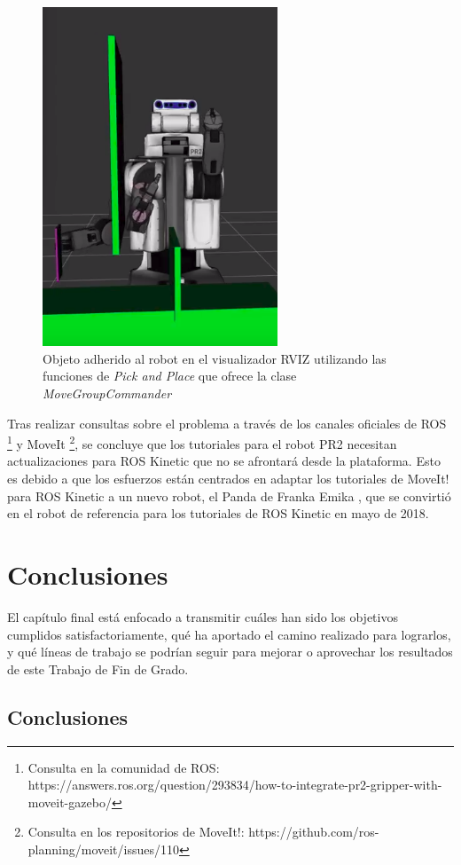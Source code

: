 \documentclass[12pt,spanish,chapterprefix, numbers=noenddot]{book}
\numberwithin{equation}{section}
\numberwithin{figure}{section}
\begin{document}
\begin{figure}[hbt!]
\centering
\includegraphics[width=7cm]{Figs/pick.png}
\par
\caption{\label{fig:pick}Objeto adherido al robot en el visualizador RVIZ utilizando las funciones de \textit{Pick and Place} que ofrece la clase \textit{MoveGroupCommander}}
\end{figure}

Tras realizar consultas sobre el problema a través de los canales oficiales de ROS \footnote{Consulta en la comunidad de ROS: https://answers.ros.org/question/293834/how-to-integrate-pr2-gripper-with-moveit-gazebo/} y MoveIt \footnote{Consulta en los repositorios de MoveIt!: https://github.com/ros-planning/moveit/issues/110}, se concluye que los tutoriales para el robot PR2 necesitan actualizaciones para ROS Kinetic que no se afrontará desde la plataforma. Esto es debido a que los esfuerzos están centrados en adaptar los tutoriales de MoveIt! para ROS Kinetic a un nuevo robot, el Panda de Franka Emika \cite{emika}, que se convirtió en el robot de referencia para los tutoriales de ROS Kinetic en mayo de 2018. 

\chapter{Conclusiones}
El capítulo final está enfocado a transmitir cuáles han sido los objetivos cumplidos satisfactoriamente, qué ha aportado el camino realizado para lograrlos, y qué líneas de trabajo se podrían seguir para mejorar o aprovechar los resultados de este Trabajo de Fin de Grado.  
\section{Conclusiones}
\end{document}
